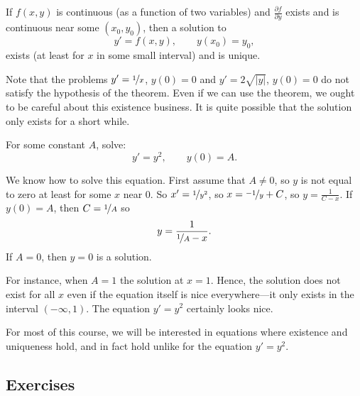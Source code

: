 \begin{theorem}%
\label{slope:picardthm}%
If $f(x,y)$ is continuous (as a function of two
variables) and $\frac{\partial f}{\partial y}$ exists and is
continuous near some $(x_0,y_0)$, then a solution to
\begin{equation*}
y' = f(x,y), \qquad y(x_0) = y_0,
\end{equation*}
exists (at least for $x$ in some small interval) and is unique.
\end{theorem}

Note that the problems $y' = \nicefrac{1}{x}$, $y(0) = 0$ and 
$y' = 2 \sqrt{\lvert y \rvert}$, $y(0) = 0$ do not satisfy the hypothesis of the
theorem.
Even if we can use the theorem,
we ought to be careful about this existence business.  It is quite
possible that the solution only exists for a short while.

\begin{example}
For some constant $A$, solve:
\begin{equation*}
y' = y^2, \qquad y(0) = A .
\end{equation*}

We know how to solve this equation.  First assume that $A \not= 0$,
so $y$ is not equal to zero at least for some $x$ near 0.  So
$x' = \nicefrac{1}{y^2}$, so
$x = \nicefrac{-1}{y} + C$, so $y = \frac{1}{C-x}$.  If $y(0) = A$, then
$C = \nicefrac{1}{A}$ so
\begin{equation*}
y = \frac{1}{\nicefrac{1}{A} - x} .
\end{equation*}
If $A=0$, then $y=0$ is a solution.

For instance, when $A=1$
the solution  at $x=1$.  Hence, the solution does not exist
for all $x$ even if the equation itself is nice everywhere---it only exists
in the interval $(-\infty,1)$.  The equation
$y' = y^2$ certainly
looks nice.
\end{example}

For most of this
course, we will be interested in equations where existence and
uniqueness hold, and in fact hold  unlike for the equation
$y'=y^2$.

\subsection{Exercises}

